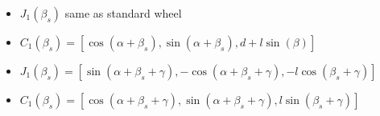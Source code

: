 \begin{itemize}
\begin{itemize}
        \end{itemize}
        \begin{itemize}
            \item $J_1(\beta_s)$ same as standard wheel
            \item $C_1(\beta_s) = [\cos(\alpha + \beta_s), \sin(\alpha + \beta_s), d + l \sin(\beta)]$
        \end{itemize}
        \begin{itemize}
            \item $J_1(\beta_s) = [\sin(\alpha + \beta_s + \gamma), -\cos(\alpha + \beta_s + \gamma), -l \cos(\beta_s + \gamma)]$
            \item $C_1(\beta_s) = [\cos(\alpha + \beta_s + \gamma), \sin(\alpha + \beta_s + \gamma), l \sin(\beta_s + \gamma)]$
        \end{itemize}
\end{itemize}

